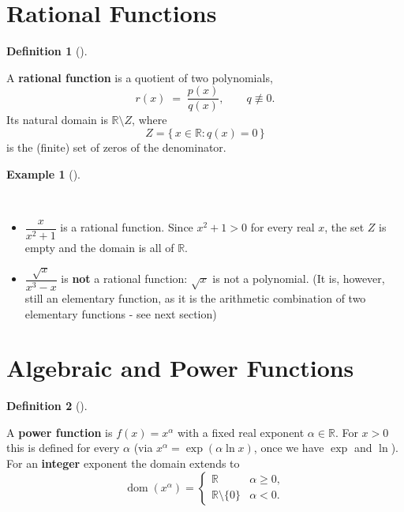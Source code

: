 \documentclass[
  letterpaper,
  DIV=11,
  numbers=noendperiod]{scrreprt}
\providecommand{\tightlist}{%
  \setlength{\itemsep}{0pt}\setlength{\parskip}{0pt}}
\theoremstyle{plain}
\theoremstyle{plain}
\theoremstyle{definition}
\newtheorem{definition}{Definition}[chapter]
\theoremstyle{definition}
\theoremstyle{definition}
\newtheorem{example}{Example}[chapter]
\theoremstyle{plain}
\theoremstyle{plain}
\theoremstyle{remark}
\begin{document}
\section{Rational Functions}\label{rational-functions}

\begin{definition}[]\protect\hypertarget{def-rational-function}{}\label{def-rational-function}

\hfill\break
A \textbf{rational function} is a quotient of two polynomials, \[
r(x) \;=\; \frac{p(x)}{q(x)}, \qquad q \not\equiv 0.
\] Its natural domain is \(\mathbb{R}\setminus Z\), where \[
Z = \{\, x\in\mathbb{R}: q(x) = 0 \,\}
\] is the (finite) set of zeros of the denominator.

\end{definition}

\begin{example}[]\protect\hypertarget{exm-rational}{}\label{exm-rational}

~

\begin{itemize}
\tightlist
\item
  \(\dfrac{x}{x^2+1}\) is a rational function. Since \(x^2+1 > 0\) for
  every real \(x\), the set \(Z\) is empty and the domain is all of
  \(\mathbb{R}\).
\item
  \(\dfrac{\sqrt{x}}{x^3 - x}\) is \textbf{not} a rational function:
  \(\sqrt{x}\) is not a polynomial. (It is, however, still an elementary
  function, as it is the arithmetic combination of two elementary
  functions - see next section)
\end{itemize}

\end{example}

\section{Algebraic and Power
Functions}\label{algebraic-and-power-functions}

\begin{definition}[]\protect\hypertarget{def-power-function}{}\label{def-power-function}

\hfill\break
A \textbf{power function} is \(f(x) = x^{\alpha}\) with a fixed real
exponent \(\alpha\in\mathbb{R}\). For \(x>0\) this is defined for every
\(\alpha\) (via \(x^{\alpha} = \exp(\alpha\ln x)\), once we have
\(\exp\) and \(\ln\)). For an \textbf{integer} exponent the domain
extends to \[
\operatorname{dom}(x^{\alpha}) = \begin{cases}
\mathbb{R}& \alpha \ge 0,\\[2pt]
\mathbb{R}\setminus\{0\} & \alpha < 0.
\end{cases}
\]

\end{definition}
\end{document}
